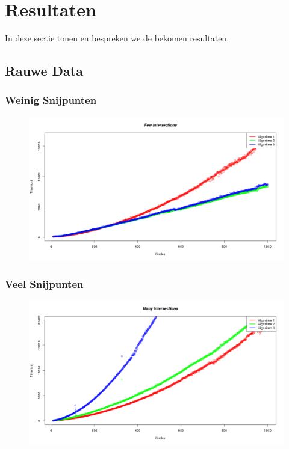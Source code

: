 \section{Resultaten}
In deze sectie tonen en bespreken we de bekomen resultaten.

\subsection{Rauwe Data}
\subsubsection{Weinig Snijpunten}
\begin{figure}[H]
   \centering
   \includegraphics[width=\textwidth]{illustraties/fewIntersections.png}
\end{figure}
   
\subsubsection{Veel Snijpunten}
\begin{figure}[H]
   \centering
   \includegraphics[width=\textwidth]{illustraties/manyIntersections.png}
\end{figure}

